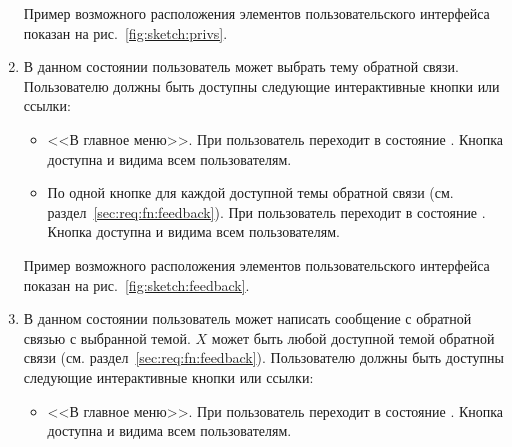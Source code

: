 \begin{enumerate}
            Пример возможного расположения элементов пользовательского интерфейса показан на
            рис.~\ref{fig:sketch:privs}.

        \item \label{itm:req:ui:states:feedback}

            В данном состоянии пользователь может выбрать тему обратной связи.
            Пользователю должны быть доступны следующие интерактивные кнопки или ссылки:
            \begin{itemize}
                \item
                    <<В главное меню>>.
                    При  пользователь переходит в состояние
                    \hyperref[itm:req:ui:states:mainmenu]
                    {}.
                    Кнопка доступна и видима всем пользователям.
                \item
                    По одной кнопке для каждой доступной темы обратной связи
                    (см. раздел~\ref{sec:req:fn:feedback}).
                    При  пользователь переходит в состояние
                    \hyperref[itm:req:ui:states:feedbackx]
                    {}.
                    Кнопка доступна и видима всем пользователям.
            \end{itemize}

            Пример возможного расположения элементов пользовательского интерфейса показан на
            рис.~\ref{fig:sketch:feedback}.

        \item \label{itm:req:ui:states:feedbackx}

            В данном состоянии пользователь может написать сообщение с обратной связью
            с выбранной темой. \(X\) может быть любой доступной темой обратной связи
            (см. раздел~\ref{sec:req:fn:feedback}).
            Пользователю должны быть доступны следующие интерактивные кнопки или ссылки:
            \begin{itemize}
                \item
                    <<В главное меню>>.
                    При  пользователь переходит в состояние
                    \hyperref[itm:req:ui:states:mainmenu]
                    {}.
                    Кнопка доступна и видима всем пользователям.
            \end{itemize}


\end{enumerate}
